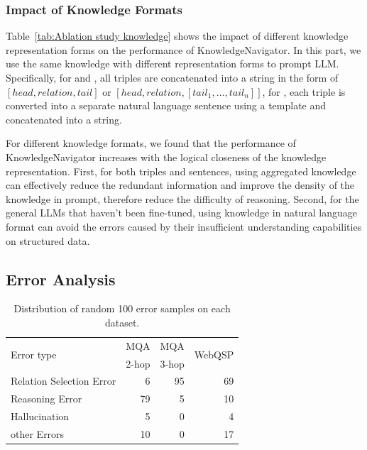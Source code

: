 \documentclass{article}
\begin{document}
\subsubsection{Impact of Knowledge Formats}


Table~\ref{tab:Ablation study knowledge} shows the impact of different knowledge representation forms on the performance of KnowledgeNavigator. In this part, we use the same knowledge with different representation forms to prompt LLM. Specifically, for  and , all triples are concatenated into a string in the form of $[head, relation, tail]$ or $[head, relation, [tail_1, \ldots, tail_n]]$, for , each triple is converted into a separate natural language sentence using a template and concatenated into a string.


For different knowledge formats, we found that the performance of KnowledgeNavigator increases with the logical closeness of the knowledge representation. First, for both triples and sentences, using aggregated knowledge can effectively reduce the redundant information and improve the density of the knowledge in prompt, therefore reduce the difficulty of reasoning. Second, for the general LLMs that haven't been fine-tuned, using knowledge in natural language format can avoid the errors caused by their insufficient understanding capabilities on structured data.



\subsection{Error Analysis}

\begin{table}
    \centering
    \begin{tabular}{lrrr}
        \toprule
        \multirow{2}{*}{Error type} & \multicolumn{1}{c}{MQA} & \multicolumn{1}{c}{MQA} & \multirow{2}{*}{WebQSP} \\
        & \multicolumn{1}{c}{2-hop} & \multicolumn{1}{c}{3-hop} & \\
        \midrule
        Relation Selection Error & 6    & 95 & 69 \\
        Reasoning Error         & 79   & 5  & 10 \\
        Hallucination           & 5    & 0  & 4 \\
        other Errors           & 10   & 0  & 17 \\
        \bottomrule
    \end{tabular}
    \caption{Distribution of random 100 error samples on each dataset.}
    \label{tab:Error Analysis}
\end{table}
\end{document}
